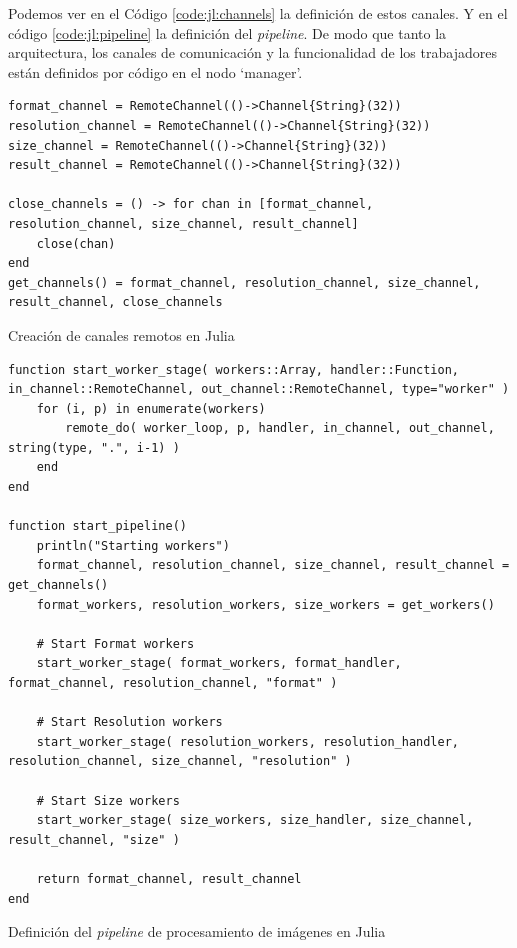 \documentclass[11pt]{article}
\begin{document}
Podemos ver en el Código \ref{code:jl:channels} la definición de estos canales. Y en el código \ref{code:jl:pipeline} la definición del \textit{pipeline}. De modo que tanto la arquitectura, los canales de comunicación y la funcionalidad de los trabajadores están definidos por código en el nodo `manager'.

\begin{listing}[ht]
\begin{verbatim}
format_channel = RemoteChannel(()->Channel{String}(32))
resolution_channel = RemoteChannel(()->Channel{String}(32))
size_channel = RemoteChannel(()->Channel{String}(32))
result_channel = RemoteChannel(()->Channel{String}(32))

close_channels = () -> for chan in [format_channel, resolution_channel, size_channel, result_channel]
    close(chan)
end
get_channels() = format_channel, resolution_channel, size_channel, result_channel, close_channels
\end{verbatim}
\caption{Creación de canales remotos en Julia}
\label{code:jl:channels}
\end{listing}

\begin{listing}[ht]
\begin{verbatim}
function start_worker_stage( workers::Array, handler::Function, in_channel::RemoteChannel, out_channel::RemoteChannel, type="worker" )
    for (i, p) in enumerate(workers)
        remote_do( worker_loop, p, handler, in_channel, out_channel, string(type, ".", i-1) )
    end
end

function start_pipeline()
    println("Starting workers")
    format_channel, resolution_channel, size_channel, result_channel = get_channels()
    format_workers, resolution_workers, size_workers = get_workers()

    # Start Format workers
    start_worker_stage( format_workers, format_handler, format_channel, resolution_channel, "format" )
    
    # Start Resolution workers
    start_worker_stage( resolution_workers, resolution_handler, resolution_channel, size_channel, "resolution" )
    
    # Start Size workers
    start_worker_stage( size_workers, size_handler, size_channel, result_channel, "size" )

    return format_channel, result_channel
end
\end{verbatim}
\caption{Definición del \textit{pipeline} de procesamiento de imágenes en Julia}
\label{code:jl:pipeline}
\end{listing}
\end{document}
